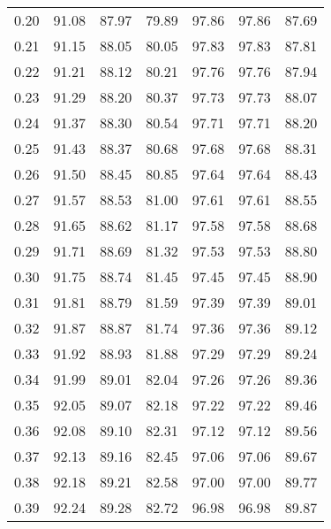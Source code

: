 \begin{tabular}{|c|c|c|c|c|c|c|}
      0.20 &     91.08 &     87.97 &      79.89 &   97.86 &      97.86 &         87.69 \\
      0.21 &     91.15 &     88.05 &      80.05 &   97.83 &      97.83 &         87.81 \\
      0.22 &     91.21 &     88.12 &      80.21 &   97.76 &      97.76 &         87.94 \\
      0.23 &     91.29 &     88.20 &      80.37 &   97.73 &      97.73 &         88.07 \\
      0.24 &     91.37 &     88.30 &      80.54 &   97.71 &      97.71 &         88.20 \\
      0.25 &     91.43 &     88.37 &      80.68 &   97.68 &      97.68 &         88.31 \\
      0.26 &     91.50 &     88.45 &      80.85 &   97.64 &      97.64 &         88.43 \\
      0.27 &     91.57 &     88.53 &      81.00 &   97.61 &      97.61 &         88.55 \\
      0.28 &     91.65 &     88.62 &      81.17 &   97.58 &      97.58 &         88.68 \\
      0.29 &     91.71 &     88.69 &      81.32 &   97.53 &      97.53 &         88.80 \\
      0.30 &     91.75 &     88.74 &      81.45 &   97.45 &      97.45 &         88.90 \\
      0.31 &     91.81 &     88.79 &      81.59 &   97.39 &      97.39 &         89.01 \\
      0.32 &     91.87 &     88.87 &      81.74 &   97.36 &      97.36 &         89.12 \\
      0.33 &     91.92 &     88.93 &      81.88 &   97.29 &      97.29 &         89.24 \\
      0.34 &     91.99 &     89.01 &      82.04 &   97.26 &      97.26 &         89.36 \\
      0.35 &     92.05 &     89.07 &      82.18 &   97.22 &      97.22 &         89.46 \\
      0.36 &     92.08 &     89.10 &      82.31 &   97.12 &      97.12 &         89.56 \\
      0.37 &     92.13 &     89.16 &      82.45 &   97.06 &      97.06 &         89.67 \\
      0.38 &     92.18 &     89.21 &      82.58 &   97.00 &      97.00 &         89.77 \\
      0.39 &     92.24 &     89.28 &      82.72 &   96.98 &      96.98 &         89.87 \\

\end{tabular}
